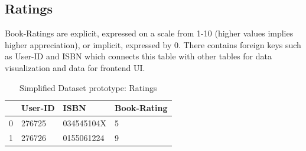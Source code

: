     
    \subsection{Ratings} 
    Book-Ratings are explicit, expressed on a scale from 1-10 (higher values implies higher appreciation), or implicit, expressed by 0. There contains foreign keys such as User-ID and ISBN which connects this table with other tables for data visualization and data for frontend UI.\\
     \begin{table}[h]
    \centering
    \caption{Simplified Dataset prototype: Ratings}
    \begin{tabular}{|p{0.2in}|p{0.6in}|p{0.9in}|p{0.8in}|}
\hline
         & User-ID & ISBN & Book-Rating \\
        \hline
        0 & 276725 & 034545104X & 5 \\
        1 & 276726 & 0155061224 & 9\\
        \hline
    \end{tabular}
    \vspace{2 mm}
    
    \label{Simplified Dataset prototype: Ratings}
\end{table}
\newpage